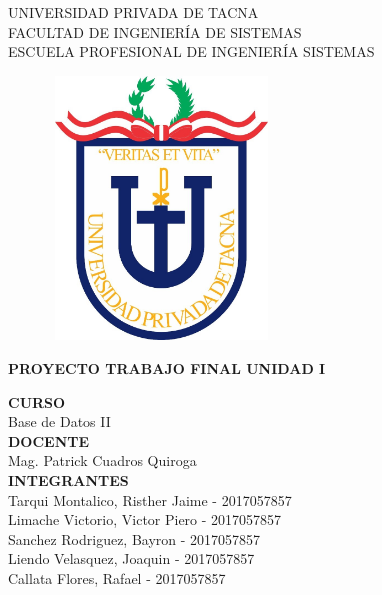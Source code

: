 \documentclass[12pt,a4paper,oneside]{book}
\begin{document}
	
	\thispagestyle{empty} 
	
	\begin{center} 
		\LARGE{UNIVERSIDAD PRIVADA DE TACNA} \\[0.5cm] 
		\Large{FACULTAD DE INGENIERÍA DE SISTEMAS}\\[0.5cm] 
		\large{ ESCUELA PROFESIONAL DE INGENIERÍA SISTEMAS} 
	\end{center}
	
	\begin{figure}[htb]
		\centering \includegraphics[width=6cm, height=7cm]{img/uptlogo.jpg}
	\end{figure}
	
	\begin{center} 
			\LARGE{\bf PROYECTO TRABAJO FINAL \newline UNIDAD I }\\ \vspace{.25cm}
		
	\end{center}

	\begin{center} 
		
		\textbf {CURSO}\\ 
		\large Base de Datos II \\
		
		\textbf {DOCENTE}\\
		\large Mag. Patrick Cuadros Quiroga\\
	
		\textbf {INTEGRANTES}\\
		\large Tarqui Montalico, Risther Jaime - 2017057857 \\
		\large Limache Victorio, Victor Piero - 2017057857 \\
		\large Sanchez Rodriguez, Bayron - 2017057857 \\
		\large Liendo Velasquez, Joaquin - 2017057857 \\
		\large Callata Flores, Rafael - 2017057857 \\
		
	\end{center}
\end{document}

